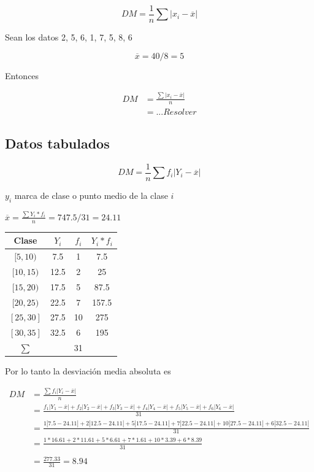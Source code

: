 \documentclass[10pt,]{krantz}
\theoremstyle{definition}
\theoremstyle{definition}
\theoremstyle{definition}
\theoremstyle{definition}
\theoremstyle{remark}
\begin{document}
\[DM=\frac{1}{n}\sum \left\vert x_i-\overline{x}\right\vert\]

Sean los datos 2, 5, 6, 1, 7, 5, 8, 6

\[\overline{x}=40/8=5\]

Entonces

\[
\begin{aligned}
DM&=\frac{\sum\left\vert x_i-\overline{x}\right \vert}{n}\\
&=... Resolver
\end{aligned}
\]

\hypertarget{datos-tabulados-1}{%
\subsection{Datos tabulados}\label{datos-tabulados-1}}

\[DM=\frac{1}{n}\sum f_i \left \vert Y_i-\overline{x}\right\vert\]

\(y_i\) marca de clase o punto medio de la clase \(i\)

\(\overline{x}=\frac{\sum Y_i*f_i}{n}=747.5/31=24.11\)

\begin{longtable}[]{@{}cccc@{}}
\toprule
Clase & \(Y_i\) & \(f_i\) & \(Y_i*f_i\)\tabularnewline
\midrule
\endhead
\([5,10)\) & 7.5 & 1 & 7.5\tabularnewline
\([10,15)\) & 12.5 & 2 & 25\tabularnewline
\([15,20)\) & 17.5 & 5 & 87.5\tabularnewline
\([20,25)\) & 22.5 & 7 & 157.5\tabularnewline
\([25,30]\) & 27.5 & 10 & 275\tabularnewline
\([30,35]\) & 32.5 & 6 & 195\tabularnewline
\(\sum\) & & 31 &\tabularnewline
\bottomrule
\end{longtable}

Por lo tanto la desviación media absoluta es

\[
\begin{aligned}
DM&=\frac{\sum f_i\left \vert Y_i-\overline{x}\right \vert}{n}\\
&=\frac{f_1\left\vert Y_1-\overline{x}\right \vert +f_2\left\vert Y_2-\overline{x}\right \vert +f_3\left\vert Y_3-\overline{x}\right \vert +f_4\left\vert Y_4-\overline{x}\right \vert +f_5\left\vert Y_5-\overline{x}\right \vert +f_6\left\vert Y_6-\overline{x}\right \vert }{31}\\
&=\frac{1\left\vert 7.5-24.11\right \vert +2\left\vert 12.5-24.11\right \vert +5\left\vert 17.5-24.11\right \vert +7\left\vert 22.5-24.11\right \vert +10\left\vert 27.5-24.11\right \vert +6\left\vert 32.5-24.11\right \vert }{31}\\
&=\frac{1*16.61 +2*11.61 +5*6.61 +7*1.61 +10*3.39 +6*8.39 }{31}\\
\\
&=\frac{277.33}{31}=8.94\\
\end{aligned}
\]
\end{document}
